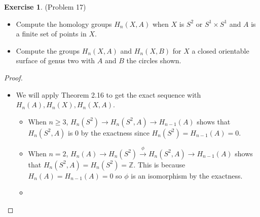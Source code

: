 \documentclass[12pt, psamsfonts]{amsart}
\theoremstyle{definition}
\newtheorem*{exer}{Exercise}
\theoremstyle{remark}
\numberwithin{equation}{section}
\begin{document}
\begin{exer}{(Problem 17)}
  $ $
  \begin{itemize}
    \item
      Compute the homology groups $H_n(X, A)$ when $X$ is $S^2$ or $S^1 \times S^1$ and $A$ is a finite set of points in $X$.
    \item
      Compute the groups $H_n(X, A)$ and $H_n(X, B)$ for $X$ a closed orientable surface of genus two with $A$ and $B$ the circles shown.
  \end{itemize}
\end{exer}

\begin{proof}
  $ $
  \begin{itemize}
    \item
      We will apply Theorem 2.16 to get the exact sequence with $H_n(A), H_n(X), H_n(X, A)$.
      \begin{itemize}
        \item
          When $n \geq 3$, $H_n(S^2) \rightarrow H_n(S^2, A) \rightarrow H_{n - 1}(A)$ shows that $H_n(S^2, A)$ is 0 by the exactness since $H_n(S^2) = H_{n - 1}(A) = 0$.
        \item
          When $n = 2$, $H_n(A) \rightarrow H_n(S^2) \xrightarrow{\phi} H_n(S^2, A) \rightarrow H_{n - 1}(A)$ shows that $H_n(S^2, A) = H_n(S^2) = \mathbb{Z}$.
          This is because $H_n(A) = H_{n - 1}(A) = 0$ so $\phi$ is an isomorphism by the exactness.
        \item
      \end{itemize}


\end{itemize}
\end{proof}
\end{document}
